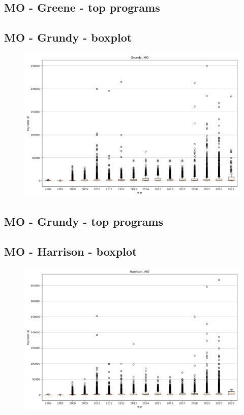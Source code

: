 \subsection*{MO - Greene - top programs}

\newpage
\subsection*{MO - Grundy - boxplot}
\begin{figure}[h]
\centering
\includegraphics[width=7in]{../output/boxplots/counties/Grundy-MO_boxplot.png}
\end{figure}


\subsection*{MO - Grundy - top programs}

\newpage
\subsection*{MO - Harrison - boxplot}
\begin{figure}[h]
\centering
\includegraphics[width=7in]{../output/boxplots/counties/Harrison-MO_boxplot.png}
\end{figure}


